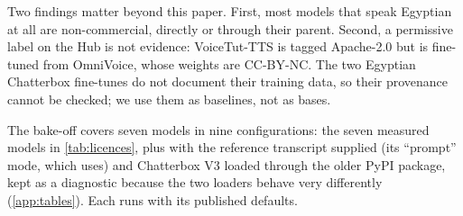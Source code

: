 Two findings matter beyond this paper. First, most models that speak Egyptian at all are non-commercial, directly or
through their parent. Second, a permissive label on the Hub is not evidence: VoiceTut-TTS is tagged Apache-2.0 but is
fine-tuned from OmniVoice, whose weights are CC-BY-NC. The two Egyptian Chatterbox fine-tunes do not document their
training data, so their provenance cannot be checked; we use them as baselines, not as bases.

The bake-off covers seven models in nine configurations: the seven measured models in \cref{tab:licences}, plus
\vox with the reference transcript supplied (its ``prompt'' mode, which \BA uses) and Chatterbox V3 loaded through
the older PyPI package, kept as a diagnostic because the two loaders behave very differently
(\cref{app:tables}). Each runs with its published defaults.
